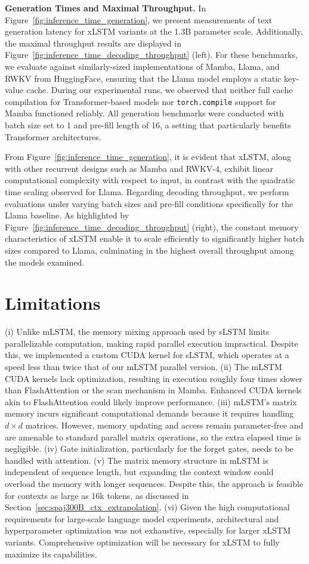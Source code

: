 \textbf{Generation Times and Maximal Throughput.} In Figure~\ref{fig:inference_time_generation}, we present measurements of text generation latency for xLSTM variants at the 1.3B parameter scale. Additionally, the maximal throughput results are displayed in Figure~\ref{fig:inference_time_decoding_throughput} (left). For these benchmarks, we evaluate against similarly-sized implementations of Mamba, Llama, and RWKV from HuggingFace, ensuring that the Llama model employs a static key-value cache. During our experimental runs, we observed that neither full cache compilation for Transformer-based models nor \texttt{torch.compile} support for Mamba functioned reliably. All generation benchmarks were conducted with batch size set to 1 and pre-fill length of 16, a setting that particularly benefits Transformer architectures.

From Figure~\ref{fig:inference_time_generation}, it is evident that xLSTM, along with other recurrent designs such as Mamba and RWKV-4, exhibit linear computational complexity with respect to input, in contrast with the quadratic time scaling observed for Llama. Regarding decoding throughput, we perform evaluations under varying batch sizes and pre-fill conditions specifically for the Llama baseline. As highlighted by Figure~\ref{fig:inference_time_decoding_throughput} (right), the constant memory characteristics of xLSTM enable it to scale efficiently to significantly higher batch sizes compared to Llama, culminating in the highest overall throughput among the models examined.

\section{Limitations}

(i) Unlike mLSTM, the memory mixing approach used by sLSTM limits parallelizable computation, making rapid parallel execution impractical. Despite this, we implemented a custom CUDA kernel for sLSTM, which operates at a speed less than twice that of our mLSTM parallel version. (ii) The mLSTM CUDA kernels lack optimization, resulting in execution roughly four times slower than FlashAttention or the scan mechanism in Mamba. Enhanced CUDA kernels akin to FlashAttention could likely improve performance. (iii) mLSTM’s matrix memory incurs significant computational demands because it requires handling $d \times d$ matrices. However, memory updating and access remain parameter-free and are amenable to standard parallel matrix operations, so the extra elapsed time is negligible. (iv) Gate initialization, particularly for the forget gates, needs to be handled with attention. (v) The matrix memory structure in mLSTM is independent of sequence length, but expanding the context window could overload the memory with longer sequences. Despite this, the approach is feasible for contexts as large as 16k tokens, as discussed in Section~\ref{sec:spaj300B_ctx_extrapolation}. (vi) Given the high computational requirements for large-scale language model experiments, architectural and hyperparameter optimization was not exhaustive, especially for larger xLSTM variants. Comprehensive optimization will be necessary for xLSTM to fully maximize its capabilities.


